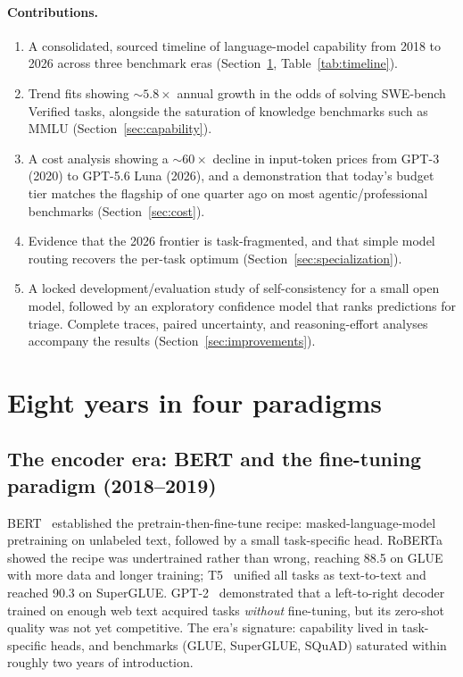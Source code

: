 \paragraph{Contributions.}
\begin{enumerate}
    \item A consolidated, sourced timeline of language-model capability from
    2018 to 2026 across three benchmark eras (Section~\ref{sec:history},
    Table~\ref{tab:timeline}).
    \item Trend fits showing ${\sim}5.8\times$ annual growth in the odds of
    solving SWE-bench Verified tasks, alongside the saturation of
    knowledge benchmarks such as MMLU (Section~\ref{sec:capability}).
    \item A cost analysis showing a ${\sim}60\times$ decline in input-token
    prices from GPT-3 (2020) to GPT-5.6 Luna (2026), and a demonstration that
    today's budget tier matches the flagship of one quarter ago on most
    agentic/professional benchmarks (Section~\ref{sec:cost}).
    \item Evidence that the 2026 frontier is task-fragmented, and that simple
    model routing recovers the per-task optimum
    (Section~\ref{sec:specialization}).
    \item A locked development/evaluation study of self-consistency for a
    small open model, followed by an exploratory confidence model that ranks
    predictions for triage. Complete traces, paired uncertainty, and
    reasoning-effort analyses accompany the results
    (Section~\ref{sec:improvements}).
\end{enumerate}

\section{Eight years in four paradigms}\label{sec:history}

\subsection{The encoder era: BERT and the fine-tuning paradigm (2018--2019)}
BERT~\cite{devlin2019bert} established the pretrain-then-fine-tune recipe:
masked-language-model pretraining on unlabeled text, followed by a small
task-specific head. RoBERTa~\cite{liu2019roberta} showed the recipe was
undertrained rather than wrong, reaching 88.5 on GLUE with more data and longer
training; T5~\cite{raffel2020t5} unified all tasks as text-to-text and reached
90.3 on SuperGLUE. GPT-2~\cite{radford2019gpt2} demonstrated that a
left-to-right decoder trained on enough web text acquired tasks
\emph{without} fine-tuning, but its zero-shot quality was not yet competitive.
The era's signature: capability lived in task-specific heads, and benchmarks
(GLUE, SuperGLUE, SQuAD) saturated within roughly two years of introduction.

